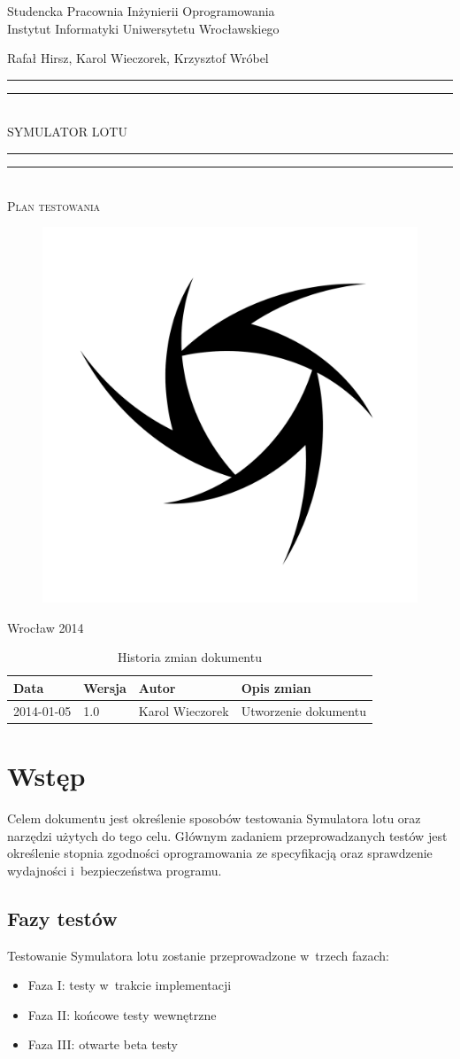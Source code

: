 \documentclass{mwrep}
\newcommand*{\titleGP}{\begingroup
\centering

{\large Studencka Pracownia Inżynierii Oprogramowania}\\Instytut Informatyki Uniwersytetu Wrocławskiego\par
\vspace*{16\baselineskip}

{\Large Rafał Hirsz, Karol Wieczorek, Krzysztof Wróbel\par}
\vspace*{\baselineskip}

\rule{\textwidth}{1.6pt}\vspace*{-\baselineskip}\vspace*{2pt}
\rule{\textwidth}{0.4pt}\\[\baselineskip]

{\Huge SYMULATOR LOTU}\\[0.2\baselineskip]

\rule{\textwidth}{0.4pt}\vspace*{-\baselineskip}\vspace{3.2pt}
\rule{\textwidth}{1.6pt}\\[\baselineskip]

\scshape
{\huge Plan testowania}\par
\vspace*{2\baselineskip}

\begin{figure}[h]
\centering
\includegraphics[width=5\baselineskip]{flightsim-team-logo.pdf}
\end{figure}
\vfill

{\large Wrocław 2014}\par

\pagebreak

\endgroup}
\begin{document}
\thispagestyle{empty}
\titleGP

\begin{center}
\begin{table}[h]
\begin{center}
\caption{Historia zmian dokumentu}\label{T:Zmiany}
\vspace{3ex}
\begin{tabularx}{1\textwidth}{|l|l|l|X|}
\hline
Data & Wersja & Autor & Opis zmian \\ \hline
2014-01-05 & 1.0 & Karol Wieczorek & Utworzenie dokumentu \\
\hline
\end{tabularx}
\end{center}
\end{table}
\end{center}

\pagebreak

\tableofcontents

\chapter{Wstęp}
Celem dokumentu jest określenie sposobów testowania Symulatora lotu oraz narzędzi użytych do tego celu. Głównym zadaniem przeprowadzanych testów jest określenie stopnia zgodności oprogramowania ze specyfikacją oraz sprawdzenie wydajności i~bezpieczeństwa programu.

\section{Fazy testów}
Testowanie Symulatora lotu zostanie przeprowadzone w~trzech fazach:
\begin{itemize}
  \item Faza I: testy w~trakcie implementacji
  \item Faza II: końcowe testy wewnętrzne
  \item Faza III: otwarte beta testy
\end{itemize}
\end{document}
